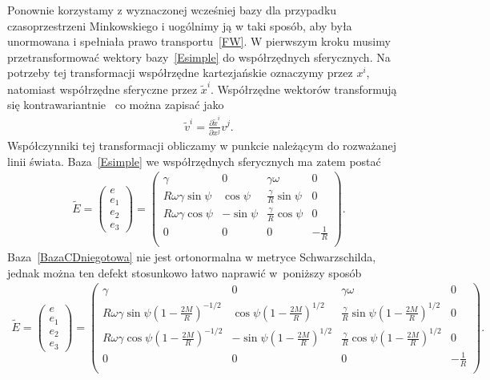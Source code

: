 Ponownie korzystamy z wyznaczonej wcześniej bazy dla przypadku
czasoprzestrzeni Minkowskiego i uogólnimy ją w taki sposób, 
aby była unormowana i spełniała prawo transportu~\eqref{FW}.
W pierwszym kroku musimy przetransformować wektory bazy~\eqref{Esimple}
do współrzędnych sferycznych.  Na potrzeby tej transformacji
współrzędne kartezjańskie oznaczymy przez $x^i$, natomiast współrzędne 
sferyczne przez $\tilde{x}^i$. Współrzędne wektorów transformują 
się kontrawariantnie~\cite{inga1980} co można zapisać jako
\begin{align}\nonumber
\tilde{v}^i = \frac{\partial \tilde{x}^i}{\partial x^j} v^j.
\end{align}
Współczynniki tej transformacji obliczamy w punkcie należącym do 
rozważanej linii świata. Baza~\eqref{Esimple} we współrzędnych sferycznych
ma zatem postać 
\begin{align}\label{BazaCDniegotowa}
\widetilde{E}=
\begin{pmatrix}
e\\
e_1\\
e_2\\
e_3
\end{pmatrix}
=
\begin{pmatrix}
\gamma & 0 & \gamma \omega & 0 \\
R\omega\gamma \sin \psi & \cos\psi & \frac{\gamma}{R} \sin\psi & 0\\
R\omega\gamma \cos \psi & -\sin\psi & \frac{\gamma}{R} \cos\psi & 0\\
0 & 0 & 0 & -\frac{1}{R} \\
\end{pmatrix}.
\end{align}
Baza~\eqref{BazaCDniegotowa}
 nie jest ortonormalna w metryce Schwarzschilda, jednak można 
ten defekt stosunkowo łatwo naprawić w~poniższy sposób
\begin{align}\nonumber
\widetilde{E}=
\begin{pmatrix}
e\\
e_1\\
e_2\\
e_3
\end{pmatrix}
=
\begin{pmatrix}
\gamma & 0 & \gamma \omega & 0 \\
R\omega\gamma \sin \psi \left(1-\frac{2 M}{R} \right)^{-1/2} 
& \cos\psi\left(1-\frac{2 M}{R} \right)^{1/2} 
& \frac{\gamma}{R} \sin\psi\left(1-\frac{2 M}{R} \right)^{1/2} & 0\\
R\omega\gamma \cos \psi\left(1-\frac{2 M}{R} \right)^{-1/2} 
& -\sin\psi \left(1-\frac{2 M}{R} \right)^{1/2}
& \frac{\gamma}{R} \cos\psi \left(1-\frac{2 M}{R} \right)^{1/2}& 0\\
0 & 0 & 0 & -\frac{1}{R} \\
\end{pmatrix}.
\end{align}

